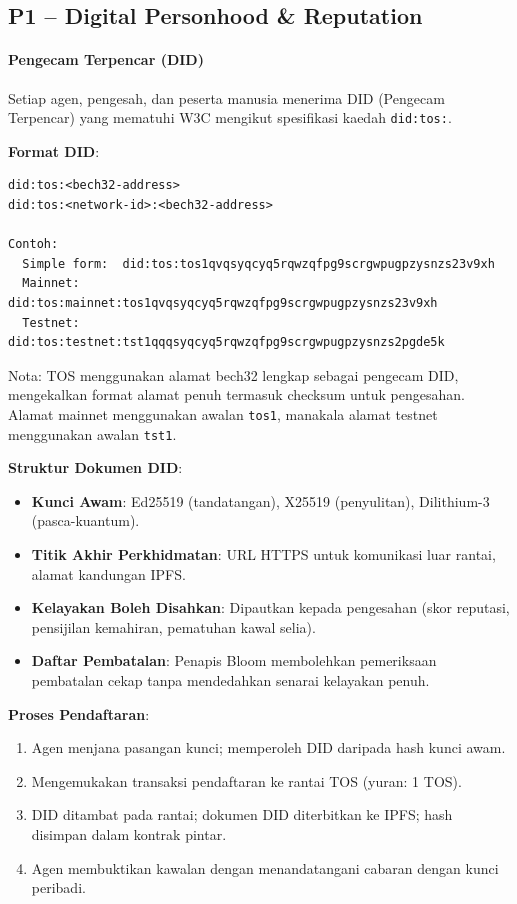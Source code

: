 \documentclass[11pt]{article}
\begin{document}
\subsection{P1 -- Digital Personhood \& Reputation}
\label{sec:pillar-identity}

\paragraph{Pengecam Terpencar (DID)}
Setiap agen, pengesah, dan peserta manusia menerima DID (Pengecam Terpencar) yang mematuhi W3C mengikut spesifikasi kaedah \texttt{did:tos:}.

\textbf{Format DID}:
\begin{verbatim}
did:tos:<bech32-address>
did:tos:<network-id>:<bech32-address>

Contoh:
  Simple form:  did:tos:tos1qvqsyqcyq5rqwzqfpg9scrgwpugpzysnzs23v9xh
  Mainnet:      did:tos:mainnet:tos1qvqsyqcyq5rqwzqfpg9scrgwpugpzysnzs23v9xh
  Testnet:      did:tos:testnet:tst1qqqsyqcyq5rqwzqfpg9scrgwpugpzysnzs2pgde5k
\end{verbatim}
Nota: TOS menggunakan alamat bech32 lengkap sebagai pengecam DID, mengekalkan format alamat penuh termasuk checksum untuk pengesahan. Alamat mainnet menggunakan awalan \texttt{tos1}, manakala alamat testnet menggunakan awalan \texttt{tst1}.

\textbf{Struktur Dokumen DID}:
\begin{itemize}[noitemsep]
  \item \textbf{Kunci Awam}: Ed25519 (tandatangan), X25519 (penyulitan), Dilithium-3 (pasca-kuantum).
  \item \textbf{Titik Akhir Perkhidmatan}: URL HTTPS untuk komunikasi luar rantai, alamat kandungan IPFS.
  \item \textbf{Kelayakan Boleh Disahkan}: Dipautkan kepada pengesahan (skor reputasi, pensijilan kemahiran, pematuhan kawal selia).
  \item \textbf{Daftar Pembatalan}: Penapis Bloom membolehkan pemeriksaan pembatalan cekap tanpa mendedahkan senarai kelayakan penuh.
\end{itemize}

\textbf{Proses Pendaftaran}:
\begin{enumerate}[noitemsep]
  \item Agen menjana pasangan kunci; memperoleh DID daripada hash kunci awam.
  \item Mengemukakan transaksi pendaftaran ke rantai TOS (yuran: 1 TOS).
  \item DID ditambat pada rantai; dokumen DID diterbitkan ke IPFS; hash disimpan dalam kontrak pintar.
  \item Agen membuktikan kawalan dengan menandatangani cabaran dengan kunci peribadi.
\end{enumerate}
\end{document}
